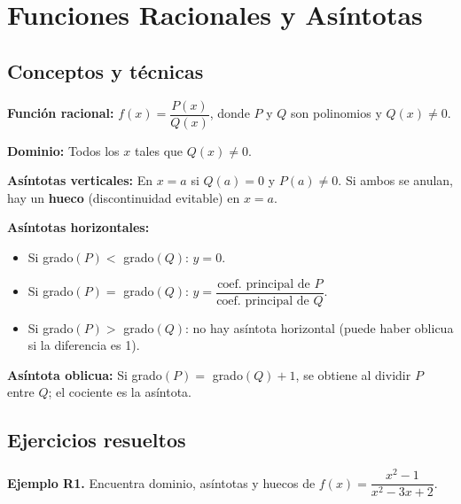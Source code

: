 \documentclass[12pt, a4paper]{article}
\begin{document}
\section{Funciones Racionales y Asíntotas}

\subsection{Conceptos y técnicas}

\begin{cuadroteoria}
  \textbf{Función racional:} $f(x) = \dfrac{P(x)}{Q(x)}$, donde $P$ y $Q$ son polinomios y $Q(x) \neq 0$.

  \textbf{Dominio:} Todos los $x$ tales que $Q(x) \neq 0$.

  \textbf{Asíntotas verticales:} En $x = a$ si $Q(a) = 0$ y $P(a) \neq 0$. Si ambos se anulan, hay un \textbf{hueco} (discontinuidad evitable) en $x = a$.

  \textbf{Asíntotas horizontales:}
  \begin{itemize}[leftmargin=*]
    \item Si grado$(P) <$ grado$(Q)$: $y = 0$.
    \item Si grado$(P) =$ grado$(Q)$: $y = \dfrac{\text{coef. principal de } P}{\text{coef. principal de } Q}$.
    \item Si grado$(P) >$ grado$(Q)$: no hay asíntota horizontal (puede haber oblicua si la diferencia es 1).
  \end{itemize}

  \textbf{Asíntota oblicua:} Si grado$(P) =$ grado$(Q) + 1$, se obtiene al dividir $P$ entre $Q$; el cociente es la asíntota.
\end{cuadroteoria}

\newpage

\subsection{Ejercicios resueltos}

\textbf{Ejemplo R1.} Encuentra dominio, asíntotas y huecos de $f(x) = \dfrac{x^2 - 1}{x^2 - 3x + 2}$.
\end{document}

